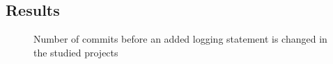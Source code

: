 %	





\subsection{Results }

\begin{figure}[tb]
	
	\centering
	
	
	
	\caption{Number of commits before an added logging statement is changed in the studied projects } 
	\label{fig:NumberofCommits}
\end{figure}

